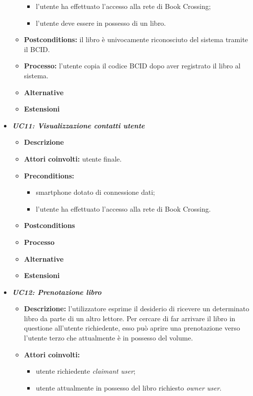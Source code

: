 \begin{itemize}
\begin{itemize}
\begin{itemize}
			\item l’utente ha effettuato l’accesso alla rete di Book Crossing;
			\item l'utente deve essere in possesso di un libro.
		\end{itemize}
		\item \textbf{Postconditions:} il libro è univocamente riconosciuto del sistema tramite il BCID.
		\item \textbf{Processo:} l'utente copia il codice BCID dopo aver registrato il libro al sistema.
		\item \textbf{Alternative}
		\item \textbf{Estensioni}
	\end{itemize}
	\item \textbf{\textit{UC11: Visualizzazione contatti utente}}
	\begin{itemize}
		\item \textbf{Descrizione}
		\item \textbf{Attori coinvolti:} utente finale.
		\item \textbf{Preconditions:}
		\begin{itemize}
			\item smartphone dotato di connessione dati;
			\item l’utente ha effettuato l’accesso alla rete di Book Crossing.
		\end{itemize}
		\item \textbf{Postconditions}
		\item \textbf{Processo}
		\item \textbf{Alternative}
		\item \textbf{Estensioni}
	\end{itemize}
	\item \textbf{\textit{UC12: Prenotazione libro}}
	\begin{itemize}
		\item \textbf{Descrizione:} l'utilizzatore esprime il desiderio di ricevere un determinato libro da parte di un altro lettore. Per cercare di far arrivare il libro in questione all'utente richiedente, esso può aprire una prenotazione verso l'utente terzo che attualmente è in possesso del volume.
		\item \textbf{Attori coinvolti:} 
		\begin{itemize}
			\item utente richiedente \textit{claimant user};
			\item utente attualmente in possesso del libro richiesto \textit{owner user}.
		\end{itemize}

\end{itemize}
\end{itemize}
